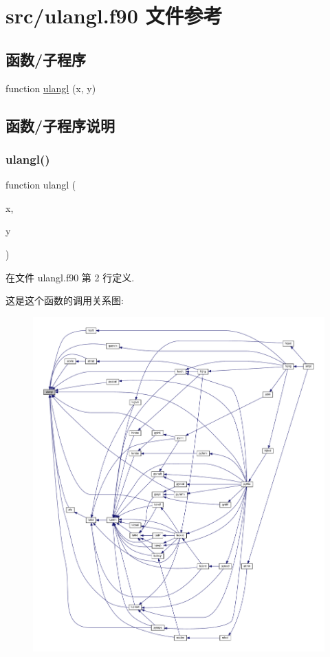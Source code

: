 \hypertarget{ulangl_8f90}{}\section{src/ulangl.f90 文件参考}
\label{ulangl_8f90}
\subsection*{函数/子程序}
\begin{DoxyCompactItemize}
\item 
function \mbox{\hyperlink{ulangl_8f90_aaa591d1ec2d7262e30d0d5cf4bc242b7}{ulangl}} (x, y)
\end{DoxyCompactItemize}


\subsection{函数/子程序说明}
\mbox{\label{ulangl_8f90_aaa591d1ec2d7262e30d0d5cf4bc242b7}} 
\subsubsection{\texorpdfstring{ulangl()}{ulangl()}}
{\footnotesize\ttfamily function ulangl (\begin{DoxyParamCaption}\item[{}]{x,  }\item[{}]{y }\end{DoxyParamCaption})}



在文件 ulangl.\+f90 第 2 行定义.

这是这个函数的调用关系图\+:
\nopagebreak
\begin{figure}[H]
\begin{center}
\leavevmode
\includegraphics[width=350pt]{ulangl_8f90_aaa591d1ec2d7262e30d0d5cf4bc242b7_icgraph}
\end{center}
\end{figure}
